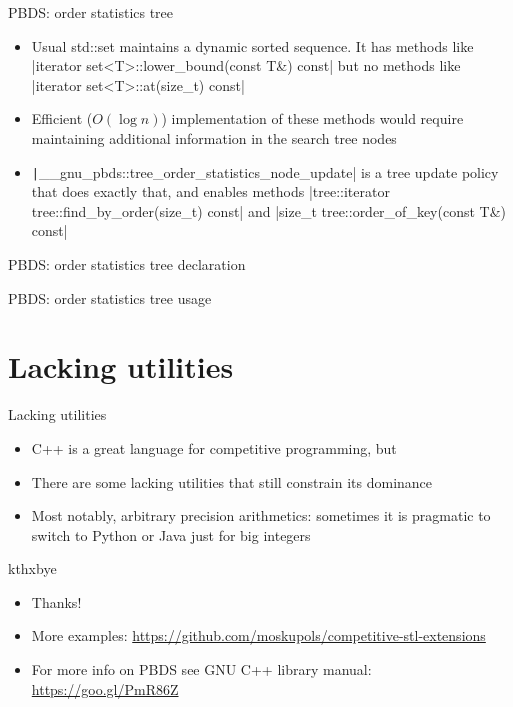 \documentclass[12pt,presentation,hyperref={unicode},aspectratio=169]{beamer}
\begin{document}
\begin{frame}{PBDS: order statistics tree}
  \begin{itemize}
    \item<1->
      Usual std::set maintains a dynamic sorted sequence.
      It has methods like
      |iterator set<T>::lower_bound(const T&) const|
      but no methods like
      |iterator set<T>::at(size_t) const|

    \item<2->
      Efficient ($O(\log{n})$) implementation of these methods would require
      maintaining additional information in the search tree nodes

    \item<3->
      \texttt|__gnu_pbds::tree_order_statistics_node_update|
      is a tree update policy that does exactly that, and enables
      methods
      |tree::iterator tree::find_by_order(size_t) const|
      and
      |size_t tree::order_of_key(const T&) const|
  \end{itemize}
\end{frame}

\begin{frame}[fragile]{PBDS: order statistics tree declaration}
\end{frame}

\begin{frame}[fragile]{PBDS: order statistics tree usage}
\end{frame}

\section{Lacking utilities}

\begin{frame}{Lacking utilities}
  \begin{itemize}
    \item<1-> C++ is a great language for competitive programming, but
    \item<2-> There are some lacking utilities that still constrain its dominance
    \item<3-> Most notably, arbitrary precision arithmetics:
      sometimes it is pragmatic to switch to Python or Java just for big
      integers
  \end{itemize}
\end{frame}

\begin{frame}{kthxbye}
  \begin{itemize}
    \item Thanks!
    \item More examples:
      \url{https://github.com/moskupols/competitive-stl-extensions}
    \item For more info on PBDS see GNU C++ library manual:
      \url{https://goo.gl/PmR86Z}
  \end{itemize}
\end{frame}
\end{document}
